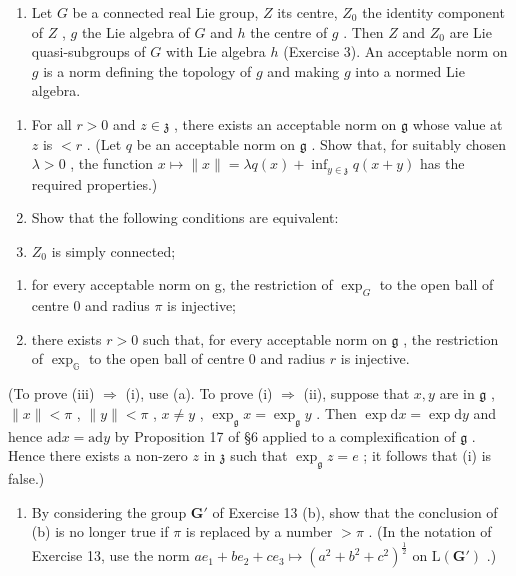 
\begin{enumerate}
\def\labelenumi{\arabic{enumi}.}
\setcounter{enumi}{17}
\tightlist
\item
  Let \(G\) be a connected real Lie group, \(Z\) its centre, \(Z_0\) the identity component of \(Z\) , \(g\) the Lie algebra of \(G\) and \(h\) the centre of \(g\) . Then \(Z\) and \(Z_0\) are Lie quasi-subgroups of \(G\) with Lie algebra \(h\) (Exercise 3). An acceptable norm on \(g\) is a norm defining the topology of \(g\) and making \(g\) into a normed Lie algebra.
\end{enumerate}

\begin{enumerate}
\def\labelenumi{(\alph{enumi})}
\item
  For all \(r > 0\) and \(z \in \mathfrak{z}\) , there exists an acceptable norm on \(\mathfrak{g}\) whose value at \(z\) is \(< r\) . (Let \(q\) be an acceptable norm on \(\mathfrak{g}\) . Show that, for suitably chosen \(\lambda > 0\) , the function \(x \mapsto \|x\| = \lambda q(x) + \inf_{y \in \mathfrak{z}} q(x + y)\) has the required properties.)
\item
  Show that the following conditions are equivalent:
\item
  \(Z_{0}\) is simply connected;
\end{enumerate}

\begin{enumerate}
\def\labelenumi{(\roman{enumi})}
\setcounter{enumi}{1}
\item
  for every acceptable norm on g, the restriction of \(\exp_{G}\) to the open ball of centre 0 and radius \(\pi\) is injective;
\item
  there exists \(r > 0\) such that, for every acceptable norm on \(\mathfrak{g}\) , the restriction of \(\exp_{\mathbb{G}}\) to the open ball of centre 0 and radius \(r\) is injective.
\end{enumerate}

(To prove (iii) \(\Rightarrow\) (i), use (a). To prove (i) \(\Rightarrow\) (ii), suppose that \(x, y\) are in \(\mathfrak{g}\) , \(\| x \| < \pi\) , \(\| y \| < \pi\) , \(x \neq y\) , \(\exp_{\mathfrak{g}} x = \exp_{\mathfrak{g}} y\) . Then \(\exp \mathrm{d} x = \exp \mathrm{d} y\) and hence \(\mathrm{ad} x = \mathrm{ad} y\) by Proposition 17 of §6 applied to a complexification of \(\mathfrak{g}\) . Hence there exists a non-zero \(z\) in \(\mathfrak{z}\) such that \(\exp_{\mathfrak{g}} z = e\) ; it follows that (i) is false.)

\begin{enumerate}
\def\labelenumi{(\alph{enumi})}
\setcounter{enumi}{2}
\tightlist
\item
  By considering the group \(\mathbf{G}'\) of Exercise 13 (b), show that the conclusion of (b) is no longer true if \(\pi\) is replaced by a number \(> \pi\) . (In the notation of Exercise 13, use the norm \(ae_{1} + be_{2} + ce_{3} \mapsto (a^{2} + b^{2} + c^{2})^{\frac{1}{2}}\) on \(\mathrm{L}(\mathbf{G}')\) .)
\end{enumerate}

